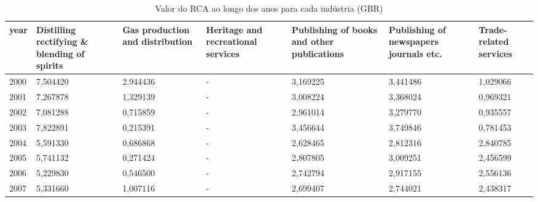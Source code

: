 \begin{table}
\centering
\caption{Valor do RCA ao longo dos anos para cada indústria (GBR)}
\begin{tabular}{p{1cm}p{2cm}p{2cm}p{2cm}p{2cm}p{2cm}p{2cm}}
\toprule
 year &  Distilling rectifying \& blending of spirits &  Gas production and distribution &  Heritage and recreational services &  Publishing of books and other publications &  Publishing of newspapers journals etc. &  Trade-related services \\
\midrule
 2000 &                                     7,504420 &                         2,944436 &                                   - &                                    3,169225 &                                3,441486 &                1,029066 \\
 2001 &                                     7,267878 &                         1,329139 &                                   - &                                    3,008224 &                                3,368024 &                0,969321 \\
 2002 &                                     7,081288 &                         0,715859 &                                   - &                                    2,961014 &                                3,279770 &                0,935557 \\
 2003 &                                     7,822891 &                         0,215391 &                                   - &                                    3,456644 &                                3,749846 &                0,781453 \\
 2004 &                                     5,591330 &                         0,686868 &                                   - &                                    2,628465 &                                2,812316 &                2,840785 \\
 2005 &                                     5,741132 &                         0,271424 &                                   - &                                    2,807805 &                                3,009251 &                2,456599 \\
 2006 &                                     5,229830 &                         0,546500 &                                   - &                                    2,742794 &                                2,917155 &                2,556136 \\
 2007 &                                     5,331660 &                         1,007116 &                                   - &                                    2,699407 &                                2,744021 &                2,438317 \\

\end{tabular}
\end{table}
